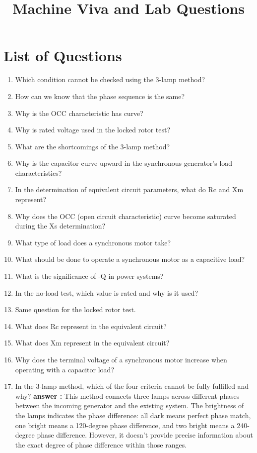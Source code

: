 \documentclass[12pt,a4paper]{article}
\title{\textbf{Machine Viva and Lab Questions}}
\author{}
\date{}
\begin{document}
	
	\maketitle
	\onehalfspacing
	
	\section*{List of Questions}
	
	\begin{enumerate}
		\item Which condition cannot be checked using the 3-lamp method?
		\item How can we know that the phase sequence is the same?
		\item Why is the OCC characteristic has curve?
		\item Why is rated voltage used in the locked rotor test?
		\item What are the shortcomings of the 3-lamp method?
		\item Why is the capacitor curve upward in the synchronous generator’s load characteristics?
		\item In the determination of equivalent circuit parameters, what do Rc and Xm represent?
		\item Why does the OCC (open circuit characteristic) curve become saturated during the Xs determination?
		\item What type of load does a synchronous motor take?
		\item What should be done to operate a synchronous motor as a capacitive load?
		\item What is the significance of -Q in power systems?
		\item In the no-load test, which value is rated and why is it used?
		\item Same question for the locked rotor test.
		\item What does Rc represent in the equivalent circuit?
		\item What does Xm represent in the equivalent circuit?
		\item Why does the terminal voltage of a synchronous motor increase when operating with a capacitor load?
		\item In the 3-lamp method, which of the four criteria cannot be fully fulfilled and why?
		\textbf{answer :} This method connects three lamps across different phases between the incoming generator and the existing system. The brightness of the lamps indicates the phase difference: all dark means perfect phase match, one bright means a 120-degree phase difference, and two bright means a 240-degree phase difference. However, it doesn't provide precise information about the exact degree of phase difference within those ranges. 
		

\end{enumerate}
\end{document}
